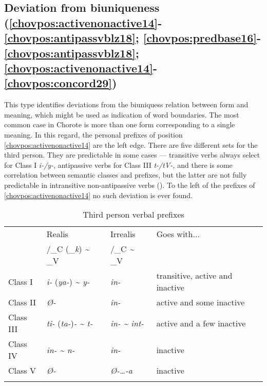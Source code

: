 \documentclass[output=paper]{langscibook}
\begin{document}
\subsection{Deviation from biuniqueness (\ref{chovpos:activenonactive14}{}-\ref{chovpos:antipassvblz18}; \ref{chovpos:predbase16}{}-\ref{chovpos:antipassvblz18}; \ref{chovpos:activenonactive14}{}-\ref{chovpos:concord29})}

This type identifies deviations from the biuniquess relation between form and meaning, which might be used as indication of word boundaries. The most common case in Chorote is more than one form corresponding to a single meaning. In this regard, the personal prefixes of position \ref{chovpos:activenonactive14} are the left edge. There are five different sets for the third person. They are predictable in some cases — transitive verbs always select for Class I \textit{i-/y-}, antipassive verbs for Class III \textit{t-/tV-,} and there is some correlation between semantic classes and prefixes, but the latter are not fully predictable in intransitive non-antipassive verbs (\citealt{Carol2013,Carol2014}). To the left of the prefixes of \ref{chovpos:activenonactive14} no such deviation is ever found.

\begin{table}[htp]
    \centering
    \caption{Third person verbal prefixes}
    \label{tab:chor:key:2}
    \begin{tabular}{llll}
    \lsptoprule
                & Realis   & Irrealis   & Goes with... \\ 
                &  /\_C (\_\textit{k}) \textit{{\textasciitilde}} \_V &  /\_C \textit{{\textasciitilde}} \_V  & \\ \midrule
         Class I & \textit{i-} (\textit{ya-}) \textit{{\textasciitilde} y-} & \textit{in-} & transitive, active and inactive\\
        Class II & \textit{Ø-} & \textit{in-} & active and some inactive\\
        Class III & \textit{ti-} (\textit{ta-})\textit{{}-} \textit{{\textasciitilde} t-} & \textit{in- {\textasciitilde} int-} & active and a few inactive\\
        Class IV & \textit{in- {\textasciitilde} n-} & \textit{in-} & inactive\\
        Class V & \textit{Ø-} & \textit{Ø-…-a} & inactive\\
\lspbottomrule
    \end{tabular}
\end{table}
 
\end{document}
